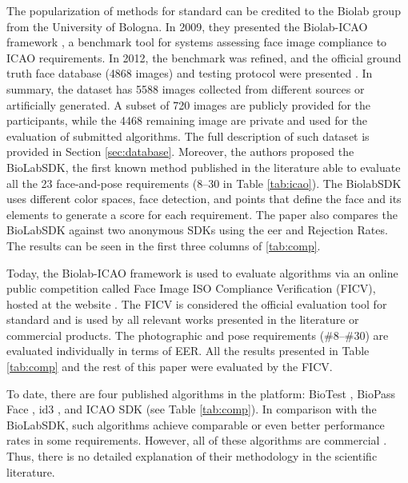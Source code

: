 The popularization of methods for \icao standard can be credited to the Biolab group from the University of Bologna. In 2009, they presented the Biolab-ICAO framework \citep{maltoni2009biolab}, a benchmark tool for systems assessing face image compliance to ICAO requirements. In 2012, the benchmark was refined, and the official ground truth face database (4868 images) and testing protocol were presented \citep{ferrara2012face}. In summary, the dataset has 5588 images collected from different sources or artificially generated. A subset of 720 images are publicly provided for the participants, while the 4468 remaining image are private and used for the evaluation of submitted algorithms. The full description of such dataset is provided in Section \ref{sec:database}. Moreover, the authors proposed the BioLabSDK, the first known method published in the literature able to evaluate all the 23 face-and-pose requirements (8--30 in Table \ref{tab:icao}). The BiolabSDK uses different color spaces, face detection, and points that define the face and its elements to generate a score for each requirement. The paper also compares the BioLabSDK against two anonymous SDKs using the \acs{eer} and Rejection Rates. The results can be seen in the first three columns of \autoref{tab:comp}.



Today, the Biolab-ICAO framework is used to evaluate algorithms via an online public competition called Face Image ISO Compliance Verification (FICV), hosted at the \fvcongoing website \citep{fvcongoing}. The FICV is considered the official evaluation tool for \icao standard and is used by all relevant works presented in the literature or commercial products. The photographic and pose requirements (\#8--\#30) are evaluated individually in terms of EER. All the results presented in Table \ref{tab:comp} and the rest of this paper were evaluated by the FICV.

To date, there are four published algorithms in the \fvcongoing platform: BioTest \citep{fvcBioTest}, BioPass Face \citep{fvcVsoft}, id3 \citep{fvcICAOCompliance}, and ICAO SDK \citep{fvcSeamfix} (see Table \ref{tab:comp}). In comparison with the BioLabSDK, such algorithms achieve comparable or even better performance rates in some requirements. However, all of these algorithms are commercial \citep{biometrika, id3, seamfix, vsoft}. Thus, there is no detailed explanation of their methodology in the scientific literature.

